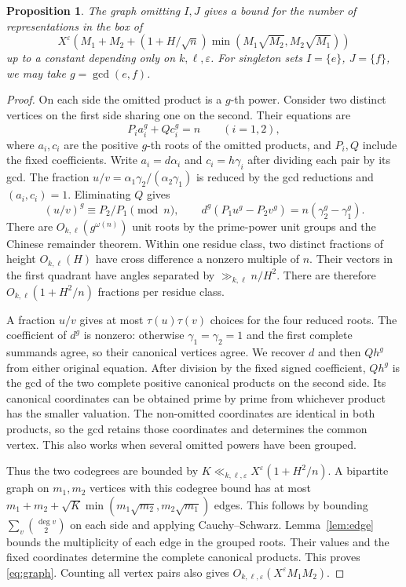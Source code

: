 \documentclass[11pt,reqno]{amsart}
\newtheorem{proposition}[theorem]{Proposition}
\newcommand{\eps}{\varepsilon}
\begin{document}
\begin{proposition}\label{prop:graph}
The graph omitting \(I,J\) gives a bound for the number of
representations in the box of
\begin{equation}\label{eq:graph}
 X^\eps\left(M_1+M_2+
     (1+H/\sqrt n)\min(M_1\sqrt{M_2},M_2\sqrt{M_1})\right)
\end{equation}
up to a constant depending only on \(k,\ell,\eps\).
For singleton sets \(I=\{e\}\), \(J=\{f\}\), we may take
\(g=\gcd(e,f)\).
\end{proposition}
\begin{proof}
On each side the omitted product is a \(g\)-th power.
Consider two distinct vertices on the first side sharing one on the
second. Their equations are
\[
                    P_i a_i^g+Q c_i^g=n\qquad (i=1,2),
\]
where \(a_i,c_i\) are the positive \(g\)-th roots of the omitted
products, and \(P_i,Q\) include the fixed coefficients.
Write \(a_i=d\alpha_i\) and \(c_i=h\gamma_i\) after dividing each
pair by its gcd. The fraction \(u/v=\alpha_1\gamma_2/(\alpha_2\gamma_1)\)
is reduced by the gcd reductions and \((a_i,c_i)=1\).
Eliminating \(Q\) gives
\begin{equation}\label{eq:recover}
 (u/v)^g\equiv P_2/P_1\pmod n,\qquad
 d^g(P_1u^g-P_2v^g)=n(\gamma_2^g-\gamma_1^g).
\end{equation}
There are \(O_{k,\ell}(g^{\omega(n)})\) unit roots by the
prime-power unit groups and the Chinese remainder theorem.
Within one residue class, two distinct fractions of height
\(O_{k,\ell}(H)\) have cross difference a nonzero multiple of \(n\).
Their vectors in the first quadrant have angles separated by
\(\gg_{k,\ell}n/H^2\). There are therefore \(O_{k,\ell}(1+H^2/n)\)
fractions per residue class.

A fraction \(u/v\) gives at most \(\tau(u)\tau(v)\) choices for
the four reduced roots. The coefficient of \(d^g\) is nonzero:
otherwise \(\gamma_1=\gamma_2=1\) and the first complete
summands agree, so their canonical vertices agree. We recover
\(d\) and then \(Qh^g\) from either original equation.
After division by the fixed signed coefficient, \(Qh^g\) is the
gcd of the two complete positive canonical products on the second
side. Its canonical coordinates can be obtained prime by prime
from whichever product has the smaller valuation. The non-omitted
coordinates are identical in both products, so the gcd retains
those coordinates and determines the common vertex. This also
works when several omitted powers have been grouped.

Thus the two codegrees are bounded by \(K\ll_{k,\ell,\eps}X^\eps(1+H^2/n)\).
A bipartite graph on \(m_1,m_2\) vertices with this codegree bound
has at most \(m_1+m_2+\sqrt K\min(m_1\sqrt{m_2},m_2\sqrt{m_1})\)
edges. This follows by bounding \(\sum_v\binom{\deg v}{2}\) on
each side and applying Cauchy--Schwarz. Lemma~\ref{lem:edge}
bounds the multiplicity of each edge in the grouped roots.
Their values and the fixed coordinates determine the complete
canonical products. This proves \eqref{eq:graph}. Counting all
vertex pairs also gives \(O_{k,\ell,\eps}(X^\eps M_1M_2)\).
\end{proof}
\end{document}
